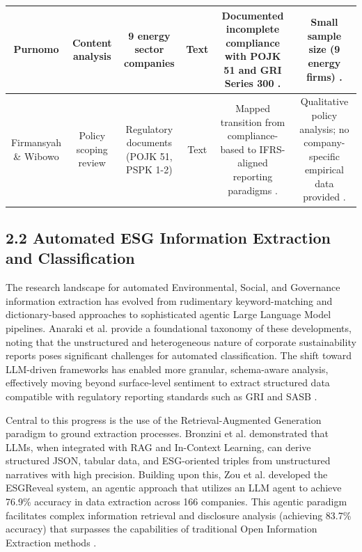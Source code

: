 \documentclass{article}
\begin{document}
\begin{table}[h!]
\begin{tabular}{|c|c|c|c|c|c|}
Purnomo  \parencite{alfonsa_roselina_purnomo_d67da232} & Content analysis & 9 energy sector companies & Text & Documented incomplete compliance with POJK 51 and GRI Series 300  \parencite{alfonsa_roselina_purnomo_d67da232}. & Small sample size (9 energy firms)  \parencite{alfonsa_roselina_purnomo_d67da232}. \\ \hline
Firmansyah \& Wibowo  \parencite{amrie_firmansyah_200ee100} & Policy scoping review & Regulatory documents (POJK 51, PSPK 1-2) & Text & Mapped transition from compliance-based to IFRS-aligned reporting paradigms  \parencite{amrie_firmansyah_200ee100}. & Qualitative policy analysis; no company-specific empirical data provided  \parencite{amrie_firmansyah_200ee100}. \\ \hline
\end{tabular}
\end{table}
\subsection{2.2 Automated ESG Information Extraction and Classification}

The research landscape for automated Environmental, Social, and Governance information extraction has evolved from rudimentary keyword-matching and dictionary-based approaches to sophisticated agentic Large Language Model pipelines. Anaraki et al.  \parencite{seyed_alireza_mousavian_anaraki_b56a1c0f} provide a foundational taxonomy of these developments, noting that the unstructured and heterogeneous nature of corporate sustainability reports poses significant challenges for automated classification. The shift toward LLM-driven frameworks has enabled more granular, schema-aware analysis, effectively moving beyond surface-level sentiment to extract structured data compatible with regulatory reporting standards such as GRI and SASB  \parencite{seyed_alireza_mousavian_anaraki_b56a1c0f}.

Central to this progress is the use of the Retrieval-Augmented Generation paradigm to ground extraction processes. Bronzini et al.  \parencite[]{marco_bronzini_bf94d949, marco_bronzini_bf94d949} demonstrated that LLMs, when integrated with RAG and In-Context Learning, can derive structured JSON, tabular data, and ESG-oriented triples from unstructured narratives with high precision. Building upon this, Zou et al.  \parencite{yi_zou_37c055f7} developed the ESGReveal system, an agentic approach that utilizes an LLM agent to achieve 76.9\% accuracy in data extraction across 166 companies. This agentic paradigm facilitates complex information retrieval and disclosure analysis (achieving 83.7\% accuracy) that surpasses the capabilities of traditional Open Information Extraction methods  \parencite[]{yi_zou_37c055f7, marco_bronzini_bf94d949}.
\end{document}
